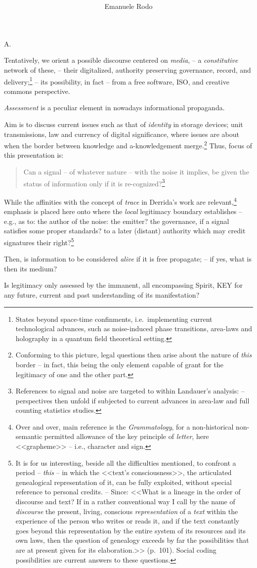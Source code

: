 \documentclass[11pt,oneside,titlepage,final,a4paper]{article}
\title{%
}
\author{Emanuele Rodo}
\begin{document}
{\sc A.}

\smallskip

Tentatively, we orient a possible discourse centered on
\textit{media}, -- a \textit{constitutive} network of these, -- their
digitalized, authority preserving governance, record, and
delivery;\footnote{States beyond space-time confinments,
  i.e.~implementing current technological advances, such as
  noise-induced phase transitions, area-laws and holography in a
  quantum field theoretical setting.%
} -- its possibility, in fact -- from a free software, ISO, and
creative commons perspective.

\textit{Assessment} is a peculiar element in nowadays informational
propaganda.

Aim is to discuss current issues such as that of \textit{identity} in
storage devices; unit transmissions, law and currency of digital
significance, where issues are about when the border between knowledge
and a-knowledgement merge.\footnote{Conforming to this picture, legal
  questions then arise about the nature of \textit{this} border -- in
  fact, this being the only element capable of grant for the
  legitimacy of one and the other part.} Thus, focus of this
presentation is:
\begin{quote} %
  {\sc Can a signal -- of whatever nature -- 
    with the noise it implies, be given the %
    status of information only if it is
    re-cognized?}\footnote{References to signal and noise are targeted
    to within Landauer's analysis: -- perspectives then unfold if
    subjected to current advances in area-law and full counting
    statistics studies.}%
\end{quote}%
While the affinities with the concept of \textit{trace} in Derrida's
work are relevant,\footnote{Over and over, main reference is the
  \textit{Grammatology}, for a non-historical non-semantic permitted
  allowance of the key principle of \textit{letter}, here <<grapheme>>
  -- i.e., character and sign.}  emphasis is placed here onto where
the \textit{local} legitimacy boundary establishes -- e.g., as to: the
author of the noise: the emitter? the governance, if a signal
satisfies some proper standards? to a later (distant) authority which
may credit signatures their right?\footnote{It is for us interesting,
  beside all the difficulties mentioned, to confront a period --
  \textit{this} -- in which the <<text's consciousness>>, the
  articulated genealogical representation of it, can be fully
  exploited, without special reference to personal credits. -- Since:
  <<What is a lineage in the order of discourse and text? If in a
  rather conventional way I call by the name of \textit{discourse} the
  present, living, conscious \emph{representation} of a \emph{text}
  within the experience of the person who writes or reads it, and if
  the text constantly goes beyond this representation by the entire
  system of its resources and its own laws, then the question of
  genealogy exceeds by far the possibilities that are at present given
  for its elaboration.>> (p.~101). Social coding possibilities are
  current answers to these questions.}

Then, is information to be considered \textit{alive} if it is free
propagate; -- if yes, what is then its medium?

Is legitimacy only assessed by the immanent, all encompassing Spirit,
{\sc KEY} for any future, current and past understanding of its
manifestation?
\end{document}
